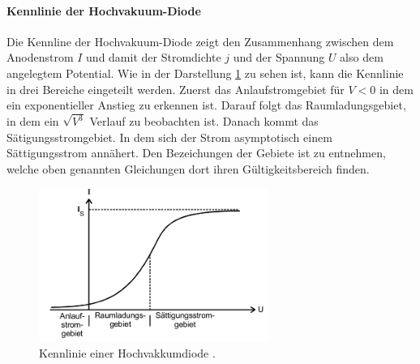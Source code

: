 \paragraph{Kennlinie der Hochvakuum-Diode}
Die Kennline der Hochvakuum-Diode zeigt den Zusammenhang zwischen
dem Anodenstrom $I$ und damit der Stromdichte $j$ und der Spannung $U$ also dem
angelegtem Potential. Wie in der Darstellung \ref{fig:KL} zu sehen ist, kann die
Kennlinie in drei Bereiche eingeteilt werden. Zuerst das Anlaufstromgebiet
für $ V < 0$ in dem ein exponentieller Anstieg zu erkennen ist. Darauf folgt
das Raumladungsgebiet, in dem ein $\sqrt{V^3}$ Verlauf zu beobachten ist. Danach
kommt das Sätigungsstromgebiet. In dem sich der Strom asymptotisch einem
Sättigungsstrom annähert. Den Bezeichungen der Gebiete ist zu entnehmen, welche
oben genannten Gleichungen dort ihren Gültigkeitsbereich finden.
\begin{figure}
  \centering
  \includegraphics[height=5cm]{logos/Kennlinie.png}
  \caption{Kennlinie einer Hochvakkumdiode \cite{Anleitung}.}
  \label{fig:KL}
\end{figure}

